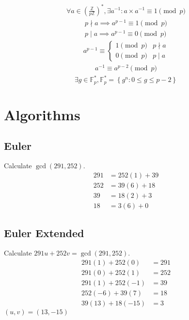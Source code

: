 \documentclass{article}
\newcommand{\curly}[1]{\left\{ #1 \right\}}
\newcommand{\soft}[1]{\left( #1 \right)}
\begin{document}
\begin{multicols*}{2}
\begin{align*}
    \forall a \in \soft{\frac{\mathbb{Z}}{p\mathbb{Z}}}^*, \exists a^{-1} : a \times a^{-1} \equiv 1 \pmod{p}
\end{align*}
\begin{align*}
    p \nmid a \implies a^{p-1} \equiv 1 \pmod{p} \\
    p  \mid a \implies a^{p-1} \equiv 0 \pmod{p}
\end{align*}
\begin{align*}
    a^{p-1} \equiv \begin{cases}
        1 \pmod{p} & p \nmid a \\
        0 \pmod{p} & p  \mid a
    \end{cases}
\end{align*}
\begin{align*}
    a^{-1} \equiv a^{p-2} \pmod{p}
\end{align*}
\begin{align*}
    \exists g \in \mathbb{F}_p^* , \mathbb{F}_p^* = \curly{g^n : 0 \leq g \leq p - 2}
\end{align*}

\section*{Algorithms}

\subsection*{Euler}
Calculate $\gcd(291, 252)$.
\begin{align*}
    291 &= 252(1) + 39        \\
    252 &= 39(6)  + 18        \\
    39  &= 18(2)  + \boxed{3} \\
    18  &= 3(6)   + 0
\end{align*}

\subsection*{Euler Extended}
Calculate $291u + 252v = \gcd(291, 252)$.
\begin{align*}
    291(1)  + 252(0)  &= 291 \\
    291(0)  + 252(1)  &= 252 \\
    291(1)  + 252(-1) &= 39  \\
    252(-6) + 39(7)   &= 18  \\
    39(13)  + 18(-15) &= 3
\end{align*}
$(u, v) = (13, -15)$


\end{multicols*}
\end{document}

